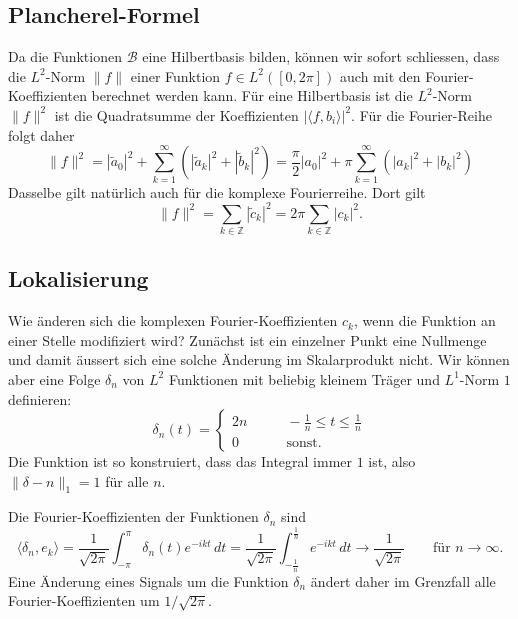 \subsection{Plancherel-Formel}
Da die Funktionen $\mathcal{B}$ eine Hilbertbasis bilden, können wir sofort
schliessen, dass die $L^2$-Norm $\|f\|$ einer Funktion $f\in L^2([0,2\pi])$
auch mit den Fourier-Koeffizienten berechnet werden kann.
Für eine Hilbertbasis ist die $L^2$-Norm $\|f\|^2$ ist die Quadratsumme
der Koeffizienten $|\langle f,b_i\rangle|^2$.
Für die Fourier-Reihe folgt daher
\[
\| f \|^2
=
|\tilde{a}_0|^2
+
\sum_{k=1}^\infty
(
|\tilde{a}_k|^2
+
|\tilde{b}_k|^2
)
=
\frac{\pi}{2}
|a_0|^2
+
\pi
\sum_{k=1}^\infty
(
|a_k|^2
+
|b_k|^2
)
\]
Dasselbe gilt natürlich auch für die komplexe Fourierreihe.
Dort gilt
\[
\| f\|^2
=
\sum_{k\in\mathbb Z} |\tilde{c}_k|^2
=
2\pi \sum_{k\in\mathbb Z} |c_k|^2.
\]

\subsection{Lokalisierung
\label{fourier:reihen:lokalisierung}}
%
Wie änderen sich die komplexen Fourier-Koeffizienten $c_k$, wenn die
Funktion an einer Stelle modifiziert wird?
Zunächst ist ein einzelner Punkt eine Nullmenge und damit äussert sich
eine solche Änderung im Skalarprodukt nicht.
Wir können aber eine Folge $\delta_n$ von $L^2$ Funktionen mit beliebig
kleinem Träger und $L^1$-Norm $1$ definieren:
\begin{equation}
\delta_n(t) = \begin{cases}
2n&\qquad-\frac1n \le t\le \frac1n\\
0&\qquad\text{sonst.}
\end{cases}
\label{fourier:deltadef}
\end{equation}
Die Funktion ist so konstruiert, dass das Integral immer $1$ ist, also
$\|\delta-n\|_1=1$ für alle $n$.

Die Fourier-Koeffizienten der Funktionen $\delta_n$ sind
\begin{equation}
\langle \delta_n,e_k \rangle
=
\frac{1}{\sqrt{2\pi}}\int_{-\pi}^\pi \delta_n(t) e^{-ik t}\,dt
=
\frac{1}{\sqrt{2\pi}}\int_{-\frac1n}^{\frac1n} e^{-ikt}\,dt
\to
\frac{1}{\sqrt{2\pi}}
\qquad\text{für $n\to\infty$}.
\label{fourier:delta0}
\end{equation}
Eine Änderung eines Signals um die Funktion $\delta_n$ ändert daher im
Grenzfall alle Fourier-Koeffizienten um $1/\sqrt{2\pi}$.

